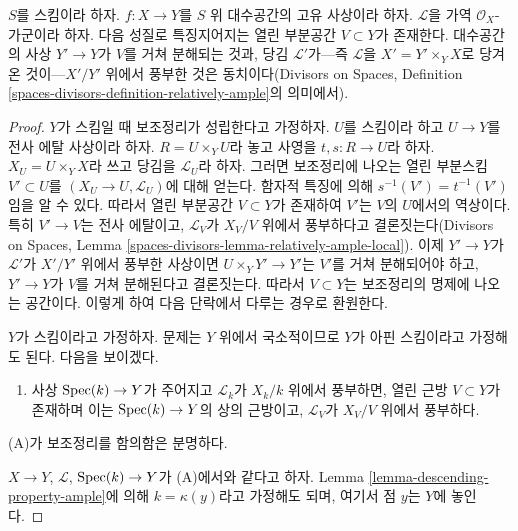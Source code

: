 \begin{lemma}
\label{lemma-ample-in-neighbourhood}
$S$를 스킴이라 하자. $f:X\to Y$를 $S$ 위 대수공간의 고유 사상이라
하자. $\mathcal{L}$을 가역 $\mathcal{O}_X$-가군이라 하자. 다음 성질로
특징지어지는 열린 부분공간 $V\subset Y$가 존재한다. 대수공간의 사상
$Y'\to Y$가 $V$를 거쳐 분해되는 것과, 당김 $\mathcal{L}'$가---즉
$\mathcal{L}$을 $X'=Y'\times_YX$로 당겨온 것이---$X'/Y'$ 위에서 풍부한 것은
동치이다(Divisors on Spaces, Definition
\ref{spaces-divisors-definition-relatively-ample}의 의미에서).
\end{lemma}

\begin{proof}
$Y$가 스킴일 때 보조정리가 성립한다고 가정하자. $U$를 스킴이라 하고
$U\to Y$를 전사 에탈 사상이라 하자. $R=U\times_YU$라 놓고 사영을
$t,s:R\to U$라 하자. $X_U=U\times_YX$라 쓰고 당김을
$\mathcal{L}_U$라 하자. 그러면 보조정리에 나오는 열린 부분스킴
$V'\subset U$를 $(X_U\to U,\mathcal{L}_U)$에 대해 얻는다. 함자적 특징에
의해 $s^{-1}(V')=t^{-1}(V')$임을 알 수 있다. 따라서 열린 부분공간
$V\subset Y$가 존재하여 $V'$는 $V$의 $U$에서의 역상이다. 특히
$V'\to V$는 전사 에탈이고, $\mathcal{L}_V$가 $X_V/V$ 위에서 풍부하다고
결론짓는다(Divisors on Spaces, Lemma
\ref{spaces-divisors-lemma-relatively-ample-local}). 이제 $Y'\to Y$가
$\mathcal{L}'$가 $X'/Y'$ 위에서 풍부한 사상이면 $U\times_YY'\to Y'$는
$V'$를 거쳐 분해되어야 하고, $Y'\to Y$가 $V$를 거쳐 분해된다고
결론짓는다. 따라서 $V\subset Y$는 보조정리의 명제에 나오는 공간이다.
이렇게 하여 다음 단락에서 다루는 경우로 환원한다.

\medskip\noindent
$Y$가 스킴이라고 가정하자. 문제는 $Y$ 위에서 국소적이므로 $Y$가 아핀
스킴이라고 가정해도 된다. 다음을 보이겠다.
\begin{enumerate}
\item[(A)] 사상 $\mathop{\mathrm{Spec}}(k)\to Y$가 주어지고 $\mathcal{L}_k$가 $X_k/k$
위에서 풍부하면, 열린 근방 $V\subset Y$가 존재하며 이는
$\mathop{\mathrm{Spec}}(k)\to Y$의 상의 근방이고, $\mathcal{L}_V$가 $X_V/V$ 위에서 풍부하다.
\end{enumerate}
(A)가 보조정리를 함의함은 분명하다.

\medskip\noindent
$X\to Y$, $\mathcal{L}$, $\mathop{\mathrm{Spec}}(k)\to Y$가 (A)에서와 같다고 하자.
Lemma \ref{lemma-descending-property-ample}에 의해 $k=\kappa(y)$라고
가정해도 되며, 여기서 점 $y$는 $Y$에 놓인다.


\end{proof}
